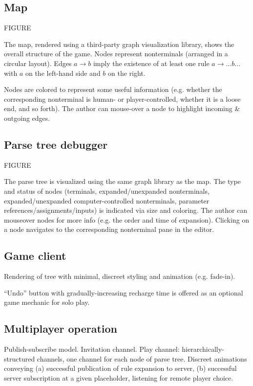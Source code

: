 \documentclass{acm_proc_article-sp}
\begin{document}
\subsection{Map}

FIGURE

The map, rendered using a third-party graph visualization library,
shows the overall structure of the game.
Nodes represent nonterminals (arranged in a circular layout).
Edges $a \to b$ imply the existence of at least one rule $a \to \ldots b \ldots$
with $a$ on the left-hand side and $b$ on the right.

Nodes are colored to represent some useful information
(e.g. whether the corresponding nonterminal is human- or player-controlled,
whether it is a loose end, and so forth).
The author can mouse-over a node to highlight incoming \& outgoing edges.

\subsection{Parse tree debugger}

FIGURE

The parse tree is visualized using the same graph library as the map.
The type and status of nodes (terminals, expanded/unexpanded nonterminals, expanded/unexpanded computer-controlled nonterminals, parameter references/assignments/inputs) is indicated via size and coloring.
The author can mouseover nodes for more info (e.g. the order and time of expansion).
Clicking on a node navigates to the corresponding nonterminal pane in the editor.

\subsection{Game client}

Rendering of tree with minimal, discreet styling and animation (e.g. fade-in).

``Undo'' button with gradually-increasing recharge time is offered as an optional game mechanic for solo play.

\subsection{Multiplayer operation}

Publish-subscribe model.
Invitation channel.
Play channel: hierarchically-structured channels, one channel for each node of parse tree.
Discreet animations conveying (a) successful publication of rule expansion to server, (b) successful server subscription at a given placeholder, listening for remote player choice.
\end{document}
